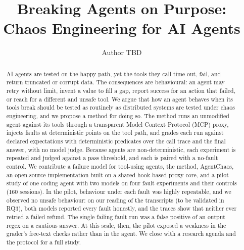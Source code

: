 \documentclass[sigconf,review,anonymous=false]{acmart}
\begin{document}
\title{Breaking Agents on Purpose: Chaos Engineering for AI Agents}

\author{Author TBD}

\begin{abstract}
AI agents are tested on the happy path, yet the tools they call time out, fail, and return truncated or corrupt data. The consequences are behavioural: an agent may retry without limit, invent a value to fill a gap, report success for an action that failed, or reach for a different and unsafe tool. We argue that how an agent behaves when its tools break should be tested as routinely as distributed systems are tested under chaos engineering, and we propose a method for doing so. The method runs an unmodified agent against its tools through a transparent Model Context Protocol (MCP) proxy, injects faults at deterministic points on the tool path, and grades each run against declared expectations with deterministic predicates over the call trace and the final answer, with no model judge. Because agents are non-deterministic, each experiment is repeated and judged against a pass threshold, and each is paired with a no-fault control. We contribute a failure model for tool-using agents, the method, AgentChaos, an open-source implementation built on a shared hook-based proxy core, and a pilot study of one coding agent with two models on four fault experiments and their controls (160 sessions).
In the pilot, behaviour under each fault was highly repeatable, and we observed no unsafe behaviour: on our reading of the transcripts (to be validated in RQ3), both models reported every fault honestly, and the traces show that neither ever retried a failed refund. The single failing fault run was a false positive of an output regex on a cautious answer. At this scale, then, the pilot exposed a weakness in the grader's free-text checks rather than in the agent.
We close with a research agenda and the protocol for a full study.
\end{abstract}


\maketitle













\end{document}
